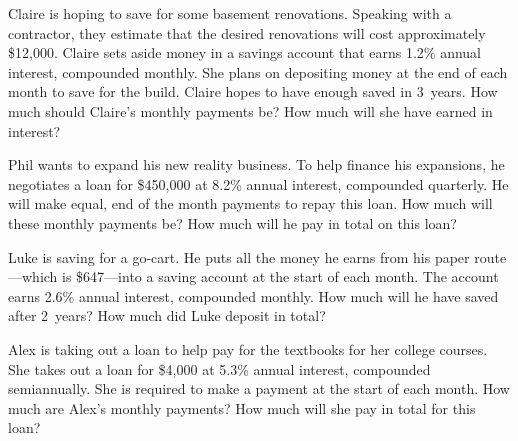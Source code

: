 \documentclass[11pt,letterpaper]{article}
\begin{document}

 Claire is hoping to save for some basement renovations. Speaking with a contractor, they estimate that the desired renovations will cost approximately \$12,000. Claire sets aside money in a savings account that earns 1.2\% annual interest, compounded monthly. She plans on depositing money at the end of each month to save for the build. Claire hopes to have enough saved in 3~years. How much should Claire's monthly payments be? How much will she have earned in interest? 



\newpage



 Phil wants to expand his new reality business. To help finance his expansions, he negotiates a loan for \$450,000 at 8.2\% annual interest, compounded quarterly. He will make equal, end of the month payments to repay this loan. How much will these monthly payments be? How much will he pay in total on this loan? 



\newpage



 Luke is saving for a go-cart. He puts all the money he earns from his paper route---which is \$647---into a saving account at the start of each month. The account earns 2.6\% annual interest, compounded monthly. How much will he have saved after 2~years? How much did Luke deposit in total? 



\newpage



 Alex is taking out a loan to help pay for the textbooks for her college courses. She takes out a loan for \$4,000 at 5.3\% annual interest, compounded semiannually. She is required to make a payment at the start of each month. How much are Alex's monthly payments? How much will she pay in total for this loan?
\end{document}
